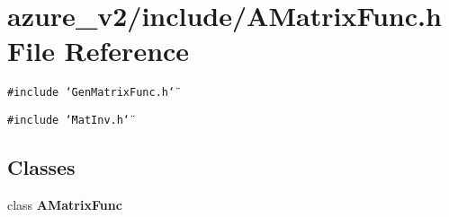 \section{azure\_\-v2/include/AMatrix\-Func.h File Reference}
\label{AMatrixFunc_8h}
{\tt \#include \char`\"{}Gen\-Matrix\-Func.h\char`\"{}}\par
{\tt \#include \char`\"{}Mat\-Inv.h\char`\"{}}\par
\subsection*{Classes}
\begin{CompactItemize}
\item 
class \bf{AMatrix\-Func}
\end{CompactItemize}
